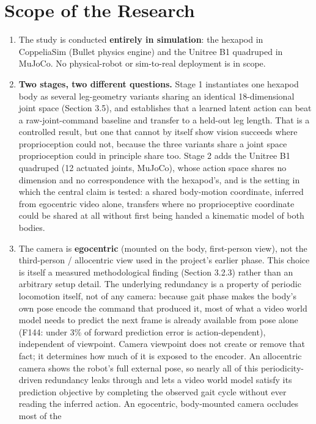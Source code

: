\documentclass[12pt,a4paper,oneside]{report}
\begin{document}
\section{Scope of the Research}
\begin{enumerate}[label=\arabic*.]
\item The study is conducted \textbf{entirely in simulation}: the hexapod in CoppeliaSim (Bullet physics engine)
  and the Unitree B1 quadruped in MuJoCo. No physical-robot or sim-to-real deployment is in scope.
\item \textbf{Two stages, two different questions.} Stage 1 instantiates one hexapod body as several leg-geometry
  variants sharing an identical 18-dimensional joint space (Section 3.5), and establishes that a learned latent
  action can beat a raw-joint-command baseline and transfer to a held-out leg length. That is a controlled result,
  but one that cannot by itself show vision succeeds where proprioception could not, because the three variants share
  a joint space proprioception could in principle share too. Stage 2 adds the Unitree B1 quadruped (12 actuated
  joints, MuJoCo), whose action space shares no dimension and no correspondence with the hexapod's, and is the
  setting in which the central claim is tested: a shared body-motion coordinate, inferred from egocentric video
  alone, transfers where no proprioceptive coordinate could be shared at all without first being handed a
  kinematic model of both bodies.
\item The camera is \textbf{egocentric} (mounted on the body, first-person view), not the third-person /
  allocentric view used in the project's earlier phase. This choice is itself a measured methodological finding
  (Section 3.2.3) rather than an arbitrary setup detail. The underlying redundancy is a property of periodic
  locomotion itself, not of any camera: because gait phase makes the body's own pose encode the command that
  produced it, most of what a video world model needs to predict the next frame is already available from pose
  alone (F144: under 3\% of forward prediction error is action-dependent), independent of viewpoint. Camera
  viewpoint does not create or remove that fact; it determines how much of it is exposed to the encoder. An
  allocentric camera shows the robot's full external pose, so nearly all of this periodicity-driven redundancy
  leaks through and lets a video world model satisfy its prediction objective by completing the observed gait
  cycle without ever reading the inferred action. An egocentric, body-mounted camera occludes most of the

\end{enumerate}
\end{document}

